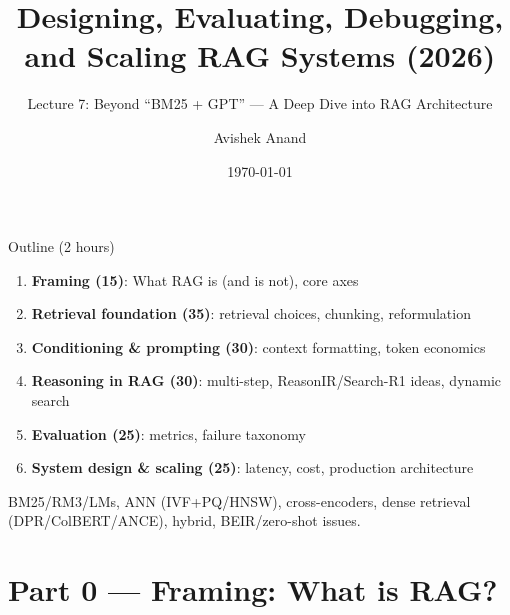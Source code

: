 \documentclass[aspectratio=169, xcolor=table]{beamer}
\title[RAG Systems 2026]{Designing, Evaluating, Debugging, and Scaling RAG Systems (2026)}
\subtitle{Lecture 7: Beyond ``BM25 + GPT'' --- A Deep Dive into RAG Architecture}
\author{Avishek Anand}
\institute{Information Retrieval}
\date{\today}
\begin{document}
\begin{frame}
\titlepage
\end{frame}

\begin{frame}{Outline (2 hours)}
\small
\begin{enumerate}
  \item \textbf{Framing (15)}: What RAG is (and is not), core axes
  \item \textbf{Retrieval foundation (35)}: retrieval choices, chunking, reformulation
  \item \textbf{Conditioning \& prompting (30)}: context formatting, token economics
  \item \textbf{Reasoning in RAG (30)}: multi-step, ReasonIR/Search-R1 ideas, dynamic search
  \item \textbf{Evaluation (25)}: metrics, failure taxonomy
  \item \textbf{System design \& scaling (25)}: latency, cost, production architecture
\end{enumerate}

\vspace{0.5em}
\begin{tcolorbox}[colback=gray!10,colframe=gray!40,title=Assumed known (not re-taught)]
BM25/RM3/LMs, ANN (IVF+PQ/HNSW), cross-encoders, dense retrieval (DPR/ColBERT/ANCE), hybrid, BEIR/zero-shot issues.
\end{tcolorbox}
\end{frame}

\section{Part 0 --- Framing: What is RAG?}

\begin{frame}[plain]
\sectionpage
\end{frame}
\end{document}
